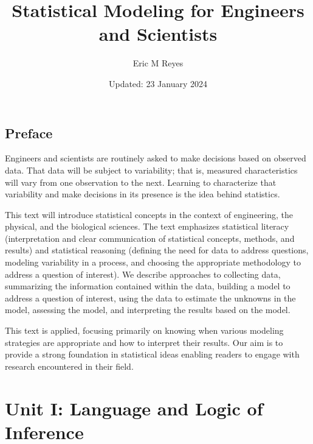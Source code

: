 \documentclass[
  letterpaper,
  DIV=11,
  numbers=noendperiod]{scrreprt}
\title{Statistical Modeling for Engineers and Scientists}
\author{Eric M Reyes}
\date{Updated: 23 January 2024}
\renewcommand*\contentsname{Table of contents}
\newcommand\contentsname{Table of contents}
\theoremstyle{definition}
\theoremstyle{definition}
\theoremstyle{plain}
\theoremstyle{remark}
\begin{document}
\maketitle
\ifdefined\Shaded\renewenvironment{Shaded}{\begin{tcolorbox}[boxrule=0pt, frame hidden, sharp corners, borderline west={3pt}{0pt}{shadecolor}, interior hidden, breakable, enhanced]}{\end{tcolorbox}}\fi

\renewcommand*\contentsname{Table of contents}
{
\hypersetup{linkcolor=}
\setcounter{tocdepth}{2}
\tableofcontents
}

\hypertarget{preface}{%
\chapter*{Preface}\label{preface}}


Engineers and scientists are routinely asked to make decisions based on
observed data. That data will be subject to variability; that is,
measured characteristics will vary from one observation to the next.
Learning to characterize that variability and make decisions in its
presence is the idea behind statistics.

This text will introduce statistical concepts in the context of
engineering, the physical, and the biological sciences. The text
emphasizes statistical literacy (interpretation and clear communication
of statistical concepts, methods, and results) and statistical reasoning
(defining the need for data to address questions, modeling variability
in a process, and choosing the appropriate methodology to address a
question of interest). We describe approaches to collecting data,
summarizing the information contained within the data, building a model
to address a question of interest, using the data to estimate the
unknowns in the model, assessing the model, and interpreting the results
based on the model.

This text is applied, focusing primarily on knowing when various
modeling strategies are appropriate and how to interpret their results.
Our aim is to provide a strong foundation in statistical ideas enabling
readers to engage with research encountered in their field.

\part{Unit I: Language and Logic of Inference}
\end{document}
